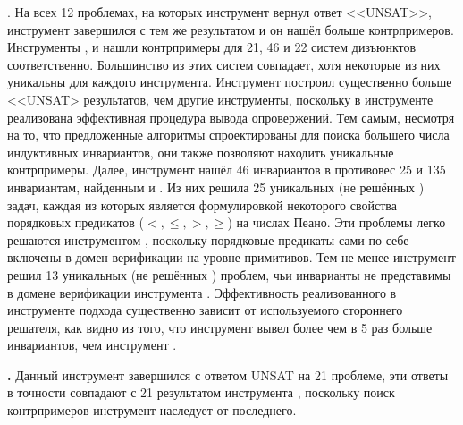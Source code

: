 \textbf{\theringen{}}. На всех 12 проблемах, на которых инструмент \eldarica{} вернул ответ <<UNSAT>>, инструмент \theringen{} завершился с тем же результатом и он нашёл больше контрпримеров.
Инструменты \ringen{\cvc{}}, \ringen{\vampire{}} и \racer{} нашли контрпримеры для 21, 46 и 22 систем дизъюнктов соответственно. Большинство из этих систем совпадает, хотя некоторые из них уникальны для каждого инструмента.
Инструмент \ringen{\vampire{}} построил существенно больше <<UNSAT> результатов, чем другие инструменты, поскольку в инструменте \vampire{} реализована эффективная процедура вывода опровержений.
Тем самым, несмотря на то, что предложенные алгоритмы спроектированы для поиска большего числа индуктивных инвариантов, они также позволяют находить уникальные контрпримеры.
Далее, инструмент \eldarica{} нашёл 46 инвариантов в противовес 25 и 135 инвариантам, найденным \ringen{\cvc{}} и \ringen{\vampire{}}.
Из них \eldarica{} решила 25 уникальных (не решённых \ringen{\cvc{}}) задач, каждая из которых является формулировкой некоторого свойства порядковых предикатов ($ <, \le,>, \ge $) на числах Пеано.
Эти проблемы легко решаются инструментом \eldarica{}, поскольку порядковые предикаты сами по себе включены в домен верификации \sizeelemclass{} на уровне примитивов.
Тем не менее инструмент \ringen{\cvc{}} решил 13 уникальных (не решённых \eldarica{}) проблем, чьи инварианты не представимы в домене верификации инструмента \eldarica{}.
Эффективность реализованного в инструменте \theringen{} подхода существенно зависит от используемого стороннего решателя, как видно из того, что инструмент \ringen{\vampire{}} вывел более чем в 5 раз больше инвариантов, чем инструмент \ringen{\cvc{}}.


\textbf{\ringenSync{}.} Данный инструмент завершился с ответом UNSAT на 21 проблеме, эти ответы в точности совпадают с 21 результатом инструмента \ringen{\cvc{}}, поскольку поиск контрпримеров инструмент \ringenSync{} наследует от последнего.

